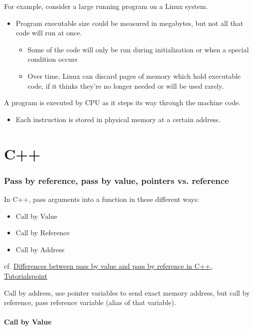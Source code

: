 \documentclass[10pt]{amsart}
\begin{document}
\begin{multicols*}{2}
For example, consider a large running program on a Linux system.

\begin{itemize}
	\item Program executable size could be measured in megabytes, but not all that code will run at once.
	\begin{itemize}
		\item Some of the code will only be run during initialization or when a special condition occurs
		\item Over time, Linux can discard pages of memory which hold executable code, if it thinks they're no longer needed or will be used rarely.
	\end{itemize}
\end{itemize}

A program is executed by CPU as it steps its way through the machine code.
\begin{itemize}
	\item Each instruction is stored in physical memory at a certain address.
\end{itemize}

\part{C++}  

\section{Pass by reference, pass by value, pointers vs. reference}

In C++, pass arguments into a function in these different ways:
\begin{itemize}
	\item Call by Value
	\item Call by Reference
	\item Call by Address
\end{itemize}
cf. \href{https://www.tutorialspoint.com/differences-between-pass-by-value-and-pass-by-reference-in-cplusplus}{Differences between pass by value and pass by reference in C++, Tutorialspoint}

Call by address, use pointer variables to send exact memory address, but call by reference, pass reference variable (alias of that variable).

\subsection{Call by Value}


\end{multicols*}
\end{document}
